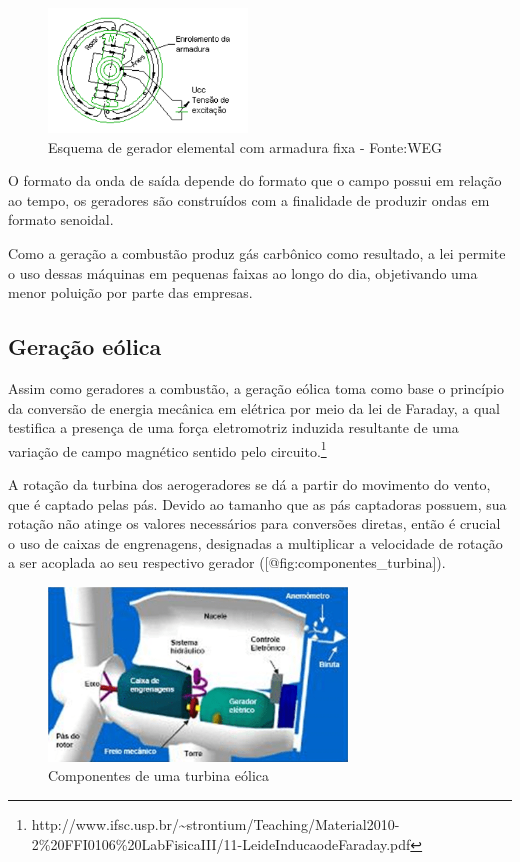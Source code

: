 \documentclass[
]{article}
\begin{document}
\begin{figure}
\hypertarget{fig:rotorgiratuxf3rio}{%
\centering
\includegraphics[width=2.08333in,height=\textheight]{img/gerador/geradorarmadurafixa.png}
\caption{Esquema de gerador elemental com armadura fixa -
Fonte:WEG}\label{fig:rotorgiratuxf3rio}
}
\end{figure}

O formato da onda de saída depende do formato que o campo possui em
relação ao tempo, os geradores são construídos com a finalidade de
produzir ondas em formato senoidal.

Como a geração a combustão produz gás carbônico como resultado, a lei
permite o uso dessas máquinas em pequenas faixas ao longo do dia,
objetivando uma menor poluição por parte das empresas.

\hypertarget{gerauxe7uxe3o-euxf3lica}{%
\subsection{Geração eólica}\label{gerauxe7uxe3o-euxf3lica}}

Assim como geradores a combustão, a geração eólica toma como base o
princípio da conversão de energia mecânica em elétrica por meio da lei
de Faraday, a qual testifica a presença de uma força eletromotriz
induzida resultante de uma variação de campo magnético sentido pelo
circuito.\footnote{http://www.ifsc.usp.br/\textasciitilde strontium/Teaching/Material2010-2\%20FFI0106\%20LabFisicaIII/11-LeideInducaodeFaraday.pdf}

A rotação da turbina dos aerogeradores se dá a partir do movimento do
vento, que é captado pelas pás. Devido ao tamanho que as pás captadoras
possuem, sua rotação não atinge os valores necessários para conversões
diretas, então é crucial o uso de caixas de engrenagens, designadas a
multiplicar a velocidade de rotação a ser acoplada ao seu respectivo
gerador ({[}@fig:componentes\_turbina{]}).

\begin{figure}
\hypertarget{fig:componentes_turbina}{%
\centering
\includegraphics[width=3.125in,height=\textheight]{img/eolico/componente-da-turbina.png}
\caption{Componentes de uma turbina
eólica}\label{fig:componentes_turbina}
}
\end{figure}
\end{document}
